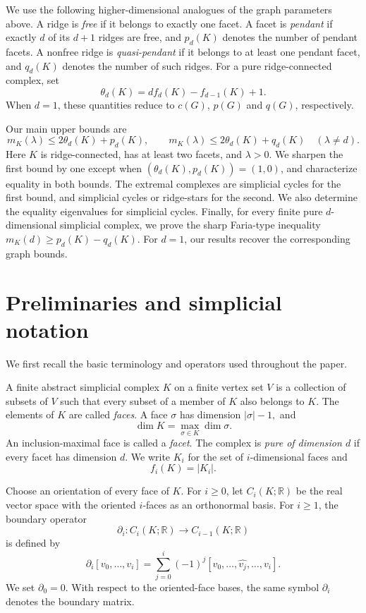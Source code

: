 \documentclass[12pt]{article}
\theoremstyle{remark}
\newcommand{\R}{\mathbb{R}}
\begin{document}
We use the following higher-dimensional analogues of the graph parameters
above.  A ridge is \emph{free} if it belongs to exactly one facet.  A facet is
\emph{pendant} if exactly $d$ of its $d+1$ ridges are free, and $p_d(K)$
denotes the number of pendant facets.  A nonfree ridge is
\emph{quasi-pendant} if it belongs to at least one pendant facet, and $q_d(K)$
denotes the number of such ridges.  For a pure ridge-connected complex, set
\[
\theta_d(K)=d f_d(K)-f_{d-1}(K)+1.
\]
When $d=1$, these quantities reduce to $c(G)$, $p(G)$ and $q(G)$,
respectively.

Our main upper bounds are
\[
m_K(\lambda)\le2\theta_d(K)+p_d(K),
\qquad
m_K(\lambda)\le2\theta_d(K)+q_d(K)\quad(\lambda\ne d).
\]
Here $K$ is ridge-connected, has at least two facets, and $\lambda>0$.  We
sharpen the first bound by one except when
$(\theta_d(K),p_d(K))=(1,0)$, and characterize equality in both bounds.  The
extremal complexes are simplicial cycles for the first bound, and simplicial
cycles or ridge-stars for the second.  We also determine the equality
eigenvalues for simplicial cycles.  Finally, for every finite pure
$d$-dimensional simplicial complex, we prove the sharp Faria-type inequality
$m_K(d)\ge p_d(K)-q_d(K)$.  For $d=1$, our results recover the corresponding
graph bounds.

\section{Preliminaries and simplicial notation}

We first recall the basic terminology and operators used throughout the paper.

A finite abstract simplicial complex $K$ on a finite vertex set $V$ is a collection of subsets of $V$ such that every subset of a member of $K$ also belongs to $K$.
The elements of $K$ are called \emph{faces}.  A face $\sigma$ has dimension
\(
|\sigma|-1,
\)
and
\[
\dim K=\max_{\sigma\in K}\dim\sigma.
\]
An inclusion-maximal face is called a \emph{facet}.  The complex is \emph{pure of dimension $d$} if every facet has dimension $d$.  We write $K_i$ for the set of $i$-dimensional faces and
\[
f_i(K)=|K_i|.
\]

Choose an orientation of every face of $K$.  For $i\ge0$, let $C_i(K;\R)$ be the real vector space with the oriented $i$-faces as an orthonormal basis.  For $i\ge1$, the boundary operator
\[
\partial_i:C_i(K;\R)\longrightarrow C_{i-1}(K;\R)
\]
is defined by
\[
\partial_i[v_0,\ldots,v_i]
=\sum_{j=0}^i(-1)^j
[v_0,\ldots,\widehat{v_j},\ldots,v_i].
\]
We set $\partial_0=0$.  With respect to the oriented-face bases, the same symbol $\partial_i$ denotes the boundary matrix.
\end{document}
